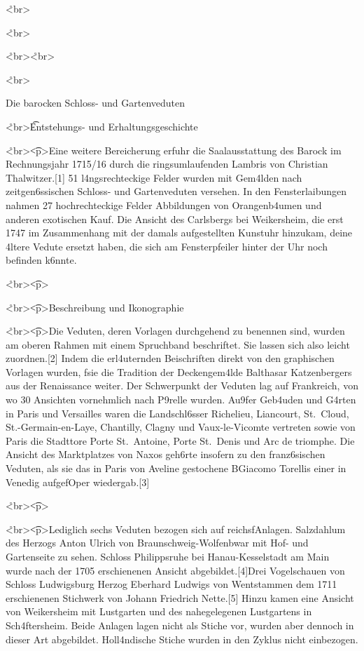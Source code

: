 \documentclass[
  letterpaper,
]{book}
\begin{document}
\r<br\textgreater{}

\r<br\textgreater{}

\r<br\textgreater{}\r<br\textgreater{}

\r<br\textgreater{}

Die barocken Schloss- und Gartenveduten

\r<br\textgreater{}\t<h2>Entstehungs- und Erhaltungsgeschichte

\r<br\textgreater{}\t<p\textgreater Eine weitere Bereicherung erfuhr die
Saalausstattung des Barock im Rechnungsjahr 1715/16 durch die
ringsumlaufenden Lambris von Christian Thalwitzer.{[}1{]} 51
l\xa4ngsrechteckige Felder wurden mit Gem\xa4lden nach
zeitgen\xb6ssischen Schloss- und Gartenveduten versehen. In den
Fensterlaibungen nahmen 27 hochrechteckige Felder Abbildungen von
Orangenb\xa4umen und anderen exotischen K\xbcbelpflanzen auf.
Die Ansicht des Carlsbergs bei Weikersheim, die erst 1747 im
Zusammenhang mit der damals aufgestellten Kunstuhr hinzukam,
d\xbcrfte eine \xa4ltere Vedute ersetzt haben, die sich am
Fensterpfeiler hinter der Uhr noch befinden k\xb6nnte.

\r<br\textgreater{}\t<p\textgreater{}

\r<br\textgreater{}\t<p\textgreater{}Beschreibung und Ikonographie

\r<br\textgreater{}\t<p\textgreater Die Veduten, deren Vorlagen
durchgehend zu benennen sind, wurden am oberen Rahmen mit einem
Spruchband beschriftet. Sie lassen sich also leicht zuordnen.{[}2{]}
Indem die erl\xa4uternden Beischriften direkt von den graphischen
Vorlagen \xbcbernommen wurden, f\xbchrten sie die Tradition der
Deckengem\xa4lde Balthasar Katzenbergers aus der Renaissance weiter.
Der Schwerpunkt der Veduten lag auf Frankreich, von wo 30 Ansichten
vornehmlich nach P\xa9relle \xbcbernommen wurden. Au\x9fer
Geb\xa4uden und G\xa4rten in Paris und Versailles waren die
Landschl\xb6sser Richelieu, Liancourt, St.~Cloud,
St.-Germain-en-Laye, Chantilly, Clagny und Vaux-le-Vicomte vertreten
sowie von Paris die Stadttore Porte St.~Antoine, Porte St.~Denis und Arc
de triomphe. Die Ansicht des Marktplatzes von Naxos geh\xb6rte
insofern zu den franz\xb6sischen Veduten, als sie das in Paris von
Aveline gestochene B\xbchnenbild Giacomo Torellis einer in Venedig
aufgef\xbchrten Oper wiedergab.{[}3{]}

\r<br\textgreater{}\t<p\textgreater{}

\r<br\textgreater{}\t<p\textgreater Lediglich sechs Veduten bezogen sich
auf reichsf\xbcrstliche Anlagen. Salzdahlum des Herzogs Anton Ulrich
von Braunschweig-Wolfenb\xbcttel war mit Hof- und Gartenseite zu
sehen. Schloss Philippsruhe bei Hanau-Kesselstadt am Main wurde nach der
1705 erschienenen Ansicht abgebildet.{[}4{]}Drei Vogelschauen von
Schloss Ludwigsburg Herzog Eberhard Ludwigs von
W\xbcrttemberg entstammen dem 1711 erschienenen Stichwerk von Johann
Friedrich Nette.{[}5{]} Hinzu kamen eine Ansicht von Weikersheim mit
Lustgarten und des nahegelegenen Lustgartens in Sch\xa4ftersheim.
Beide Anlagen lagen nicht als Stiche vor, wurden aber dennoch in dieser
Art abgebildet. Holl\xa4ndische Stiche wurden in den Zyklus nicht
einbezogen.
\end{document}
